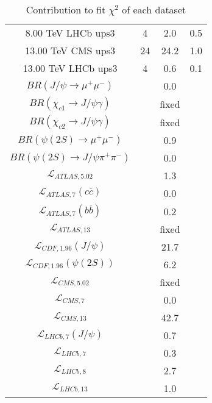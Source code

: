 \begin{table}[h!]
\begin{tabular}{c|c|c|c}
8.00 TeV LHCb ups3 & 4 & 2.0 & 0.5 \\
13.00 TeV CMS ups3 & 24 & 24.2 & 1.0 \\
13.00 TeV LHCb ups3 & 4 & 0.6 & 0.1 \\
\hline
$BR(J/\psi\rightarrow\mu^+\mu^-)$ &  & 0.0 &  \\
$BR(\chi_{c1}\rightarrow J/\psi\gamma)$ &  & fixed & \\
$BR(\chi_{c2}\rightarrow J/\psi\gamma)$ &  & fixed & \\
$BR(\psi(2S)\rightarrow\mu^+\mu^-)$ &  & 0.9 &  \\
$BR(\psi(2S)\rightarrow J/\psi\pi^+\pi^-)$ &  & 0.0 &  \\
$\mathcal L_{ATLAS,5.02}$ &  & 1.3 &  \\
$\mathcal L_{ATLAS,7}(c\overline c)$ &  & 0.0 &  \\
$\mathcal L_{ATLAS,7}(b\overline b)$ &  & 0.2 &  \\
$\mathcal L_{ATLAS,13}$ &  & fixed & \\
$\mathcal L_{CDF,1.96}(J/\psi)$ &  & 21.7 &  \\
$\mathcal L_{CDF,1.96}(\psi(2S))$ &  & 6.2 &  \\
$\mathcal L_{CMS,5.02}$ &  & fixed & \\
$\mathcal L_{CMS,7}$ &  & 0.0 &  \\
$\mathcal L_{CMS,13}$ &  & 42.7 &  \\
$\mathcal L_{LHCb,7}(J/\psi)$ &  & 0.7 &  \\
$\mathcal L_{LHCb,7}$ &  & 0.3 &  \\
$\mathcal L_{LHCb,8}$ &  & 2.7 &  \\
$\mathcal L_{LHCb,13}$ &  & 1.0 &  \\
\end{tabular}
\caption{Contribution to fit $\chi^2$ of each dataset}
\end{table}
